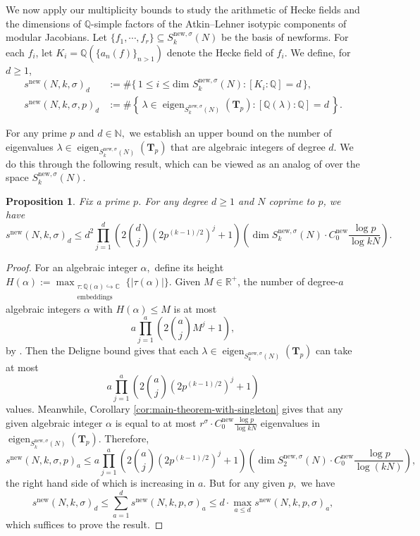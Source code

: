 \documentclass[11pt,letterpaper,reqno]{amsart}
\newtheorem{proposition}[theorem]{Proposition}
\theoremstyle{definition}
\numberwithin{equation}{section}
\numberwithin{figure}{section}
\numberwithin{table}{section}
\newcommand{\QQ}{\mathbb{Q}}
\newcommand{\nw}{\mathrm{new}}
\newcommand{\eigen}{\operatorname{eigen}}
\begin{document}
We now apply our multiplicity bounds to study the arithmetic of Hecke fields and the dimensions of $\QQ$-simple factors of the Atkin--Lehner isotypic components of modular Jacobians. Let $\{f_1, \cdots, f_r\} \subseteq S_k^{\nw, \sigma}(N)$ be the basis of newforms. For each $f_i$, let
$K_{i} = \mathbb{Q}(\{a_n(f)\}_{n > 1})$ denote the Hecke field of $f_i$. We define, for $d\ge1$,
\begin{align*}
    s^\nw(N,k,\sigma)_d &:=\#\{\,1 \le i \le \text{dim } S_k^{\nw, \sigma}(N) : [K_i:\mathbb{Q}] = d\,\},\\
    s^\nw(N,k,\sigma,p)_d &:= \#\left\{\, \lambda \in \operatorname{eigen}_{S_k^{\nw, \sigma}(N)}(\mathbf{T}_p) : [\mathbb{Q}(\lambda) : \mathbb{Q}] = d \,\right\}.
\end{align*}

For any prime $p$ and $d \in \mathbb{N},$ we establish an upper bound on the number of eigenvalues $\lambda \in \eigen_{S_k^{\nw, \sigma}(N)} \left(\mathbf{T}_{p} \right)$ that are algebraic integers of degree $d.$ We do this through the following result, which can be viewed as an analog of \cite[Theorem 5]{MS07} over the space $S_k^{\nw, \sigma}(N).$

\begin{proposition}\label{prop:degree-bound}
    Fix a prime $p$. For any degree $d\ge1$ and $N$ coprime to $p$, we have
    $$s^\nw(N,k,\sigma)_d \leq d^2 \prod_{j=1}^{d} \left( 2 \binom{d}{j} \left( 2p^{(k - 1)/2} \right)^{j} + 1 \right) \left( \operatorname{dim } S_k^{\nw, \sigma}(N) \cdot C_0^\nw \frac{\log p}{\log kN} \right).$$
\end{proposition}

\begin{proof}
    For an algebraic integer $\alpha,$ define its height $H(\alpha) := \max_{\substack{\tau: \mathbb{Q}(\alpha) \hookrightarrow \mathbb{C} \\ \text{embeddings}}} \{ \left| \tau(\alpha) \right|  \}.$ Given $M \in \mathbb{R}^+$, the number of degree-$a$ algebraic integers $\alpha$ with $H(\alpha) \leq M$ is at most
    $$a \prod_{j=1}^{a} \left( 2 \binom{a}{j} M^{j} + 1 \right),$$
    by \cite[Proposition 30]{MS07}. Then the Deligne bound gives that each $\lambda \in \eigen_{S_k^{\nw, \sigma}(N)}(\mathbf{T}_p)$ can take at most
    $$a \prod_{j=1}^{a} \left( 2 \binom{a}{j} \left( 2p^{(k - 1)/2}  \right)^{j} + 1 \right)$$
    values. Meanwhile, Corollary \ref{cor:main-theorem-with-singleton} gives that any given algebraic integer $\alpha$ is equal to at most $r^\sigma \cdot C_0^\nw \frac{\log p}{\log kN}$ eigenvalues in $\eigen_{S_k^{\nw, \sigma}(N)}(\mathbf{T}_p).$ Therefore,
    \begin{equation}
\label{eq:bound-p}
s^\nw(N, k, \sigma, p)_a
\leq
a \prod_{j=1}^{a}
\left(
2 \binom{a}{j}
\left(2p^{(k-1)/2}\right)^j
+1
\right)
\left(
\dim S_2^{\nw, \sigma}(N)\cdot C_0^\nw
\frac{\log p}{\log(kN)}
\right),
\end{equation}
the right hand side of which is increasing in $a.$ But for any given $p,$ we have
    $$s^\nw(N, k, \sigma)_d \leq \sum_{a = 1}^d s^\nw(N, k, p, \sigma)_a \leq d \cdot \max_{a \leq d} s^\nw(N, k, p, \sigma)_a,$$
    which suffices to prove the result.
\end{proof}
\end{document}
